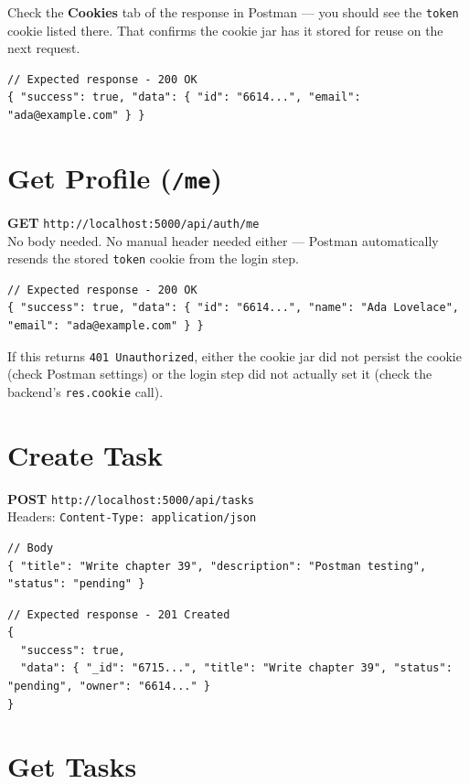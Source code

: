 Check the \textbf{Cookies} tab of the response in Postman --- you should see
the \texttt{token} cookie listed there. That confirms the cookie jar has it
stored for reuse on the next request.

\begin{lstlisting}
// Expected response - 200 OK
{ "success": true, "data": { "id": "6614...", "email": "ada@example.com" } }
\end{lstlisting}

\section{Get Profile (\texttt{/me})}

\textbf{GET} \texttt{http://localhost:5000/api/auth/me}\\
No body needed. No manual header needed either --- Postman automatically
resends the stored \texttt{token} cookie from the login step.

\begin{lstlisting}
// Expected response - 200 OK
{ "success": true, "data": { "id": "6614...", "name": "Ada Lovelace", "email": "ada@example.com" } }
\end{lstlisting}

If this returns \texttt{401 Unauthorized}, either the cookie jar did not
persist the cookie (check Postman settings) or the login step did not
actually set it (check the backend's \texttt{res.cookie} call).

\section{Create Task}

\textbf{POST} \texttt{http://localhost:5000/api/tasks}\\
Headers: \texttt{Content-Type: application/json}

\begin{lstlisting}
// Body
{ "title": "Write chapter 39", "description": "Postman testing", "status": "pending" }
\end{lstlisting}

\begin{lstlisting}
// Expected response - 201 Created
{
  "success": true,
  "data": { "_id": "6715...", "title": "Write chapter 39", "status": "pending", "owner": "6614..." }
}
\end{lstlisting}

\section{Get Tasks}

